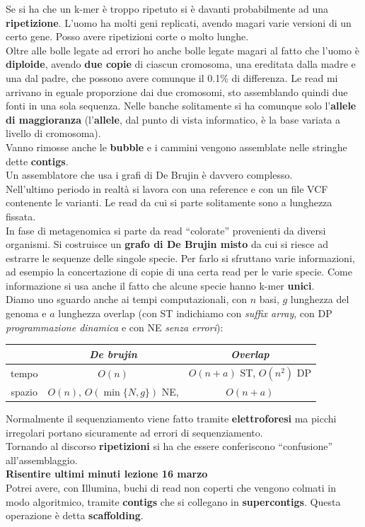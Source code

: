 \documentclass[a4paper,12pt, oneside]{book}
\begin{document}
Se si ha che un k-mer è troppo ripetuto si è davanti probabilmente ad una
\textbf{ripetizione}. L'uomo ha molti geni replicati, avendo magari varie
versioni di un certo gene. Posso avere ripetizioni corte o molto lunghe.\\
Oltre alle bolle legate ad errori ho anche bolle legate magari al fatto che
l'uomo è \textbf{diploide}, avendo \textbf{due copie} di ciascun cromosoma, una
ereditata dalla madre e una dal padre, che possono avere comunque il 0.1\% di
differenza. Le read mi arrivano in eguale proporzione dai due cromosomi, sto
assemblando quindi due fonti in una sola sequenza. Nelle banche solitamente si
ha comunque solo l'\textbf{allele di maggioranza} (l'\textbf{allele}, dal punto
di vista informatico, è la base variata a livello di cromosoma). \\
Vanno rimosse anche le \textbf{bubble} e i cammini vengono assemblate nelle
stringhe dette \textbf{contigs}.\\
Un assemblatore che usa i grafi di De Brujin è davvero complesso.\\
Nell'ultimo periodo in realtà si lavora con una reference e con un file VCF
contenente le varianti. Le read da cui si parte solitamente sono a lunghezza
fissata. \\
In fase di metagenomica si parte da read ``colorate'' provenienti da diversi
organismi. Si costruisce un \textbf{grafo di De Brujin misto} da cui si riesce
ad estrarre le sequenze delle singole specie. Per farlo si sfruttano varie
informazioni, ad esempio la concertazione di copie di una certa read per le
varie specie. Come informazione si usa anche il fatto che alcune specie hanno
k-mer \textbf{unici}. \\
Diamo uno sguardo anche ai tempi computazionali, con $n$ basi, $g$ lunghezza del
genoma e $a$ lunghezza overlap (con ST indichiamo con \textit{suffix array}, con
DP \textit{programmazione dinamica} e con NE \textit{senza errori}): 
\begin{table}[H]
  \centering
  \begin{tabular}{c|c|c}
    &\textbf{\textit{De brujin}} &\textbf{\textit{Overlap}}\\
    \hline
    tempo & $O(n)$ & $O(n+a)$ ST, $O(n^2)$ DP\\                 
    \hline
    spazio & $O(n)$, $O(\min\{N,g\})$ NE, & $O(n+a)$
  \end{tabular}
\end{table}
Normalmente il sequenziamento viene fatto tramite \textbf{elettroforesi} ma
picchi irregolari portano sicuramente ad errori di sequenziamento.\\
Tornando al discorso \textbf{ripetizioni} si ha che essere conferiscono
``confusione'' all'assemblaggio.\\
\textbf{Risentire ultimi minuti lezione 16 marzo}\\
Potrei avere, con Illumina, buchi di read non coperti che vengono colmati in
modo algoritmico, tramite \textbf{contigs} che si collegano in
\textbf{supercontigs}. Questa operazione è detta \textbf{scaffolding}.
\end{document}
